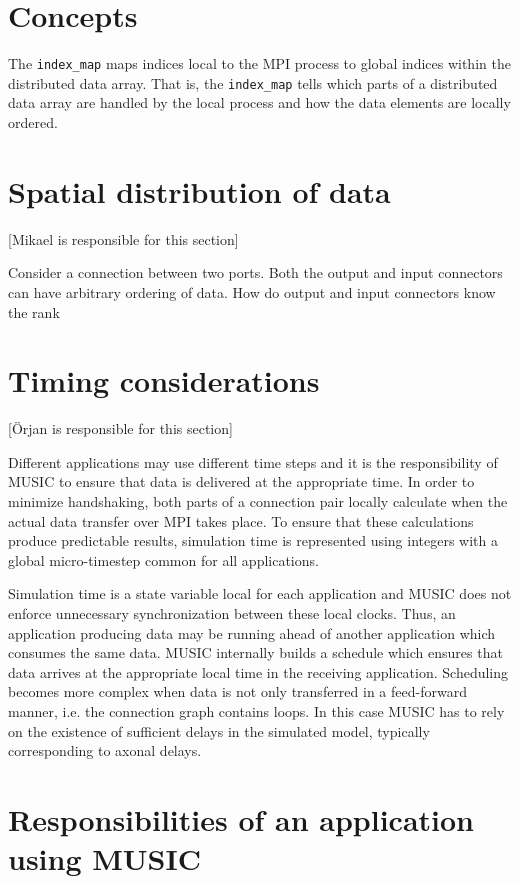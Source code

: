 \documentclass[a4paper]{report}
\newcommand{\responsible}[1]%
{{\color{red}[#1 is responsible for this section]}}
\begin{document}
\section{Concepts}

The \verb|index_map| maps indices local to the MPI process to global
indices within the distributed data array.  That is, the
\verb|index_map| tells which parts of a distributed data array are
handled by the local process and how the data elements are locally
ordered.

\section{Spatial distribution of data}
\responsible{Mikael}

Consider a connection between two ports.  Both the output and input
connectors can have arbitrary ordering of data.  How do output and
input connectors know the rank

\section{Timing considerations}
\responsible{Örjan}

Different applications may use different time steps and it is the
responsibility of MUSIC to ensure that data is delivered at the
appropriate time.  In order to minimize handshaking, both parts of a
connection pair locally calculate when the actual data transfer over
MPI takes place.  To ensure that these calculations produce
predictable results, simulation time is represented using integers
with a global micro-timestep common for all applications.

Simulation time is a state variable local for each application and
MUSIC does not enforce unnecessary synchronization between these local
clocks.  Thus, an application producing data may be running ahead of
another application which consumes the same data.  MUSIC internally
builds a schedule which ensures that data arrives at the appropriate
local time in the receiving application.  Scheduling becomes more
complex when data is not only transferred in a feed-forward manner,
i.e. the connection graph contains loops.  In this case MUSIC has to
rely on the existence of sufficient delays in the simulated model,
typically corresponding to axonal delays.


\section{Responsibilities of an application using MUSIC}
\end{document}
